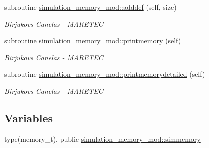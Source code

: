 \begin{DoxyCompactItemize}
subroutine \hyperlink{namespacesimulation__memory__mod_ac6d6853bc462947d24a8f6234d625138}{simulation\+\_\+memory\+\_\+mod\+::adddef} (self, size)
\begin{DoxyCompactList}\small\item\em Birjukovs Canelas -\/ M\+A\+R\+E\+T\+EC \end{DoxyCompactList}\item 
subroutine \hyperlink{namespacesimulation__memory__mod_a16a7a1c7e88fe5a5523d23f83f0e04a0}{simulation\+\_\+memory\+\_\+mod\+::printmemory} (self)
\begin{DoxyCompactList}\small\item\em Birjukovs Canelas -\/ M\+A\+R\+E\+T\+EC \end{DoxyCompactList}\item 
subroutine \hyperlink{namespacesimulation__memory__mod_a894bd4ec7462fd634d328ee5be4c6483}{simulation\+\_\+memory\+\_\+mod\+::printmemorydetailed} (self)
\begin{DoxyCompactList}\small\item\em Birjukovs Canelas -\/ M\+A\+R\+E\+T\+EC \end{DoxyCompactList}\end{DoxyCompactItemize}
\subsection*{Variables}
\begin{DoxyCompactItemize}
\item 
type(memory\+\_\+t), public \hyperlink{namespacesimulation__memory__mod_af3e2714796469b4b1ec247569b184088}{simulation\+\_\+memory\+\_\+mod\+::simmemory}
\end{DoxyCompactItemize}
